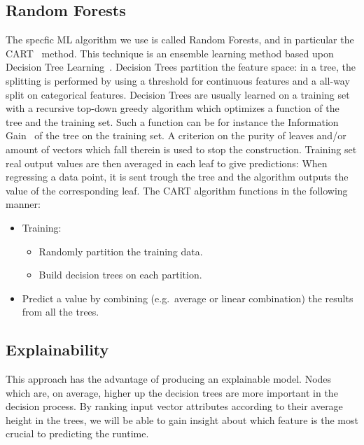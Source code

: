 \documentclass{article}
\begin{document}
\subsection{Random Forests}
\label{sub:random_forests}
The specfic ML algorithm we use is called Random Forests, and in particular the CART~\cite{randomforest} method.
This technique is an ensemble learning method based upon Decision Tree Learning~\cite{decisiontrees}.
Decision Trees partition the feature space: in a tree, the splitting is performed by using a threshold for continuous features and a all-way split on categorical features.
Decision Trees are usually learned on a training set with a recursive top-down greedy algorithm which optimizes a function of the tree and the training set.
Such a function can be for instance the Information Gain~\cite{kullback} of the tree on the training set. A criterion on the purity of leaves and/or amount of vectors which fall therein is used to stop the construction. Training set real output values are then averaged in each leaf to give predictions: When regressing a data point, it is sent trough the tree and the algorithm outputs the value of the corresponding leaf.
The CART algorithm functions in the following manner:
\begin{itemize}
  \item Training: \begin{itemize}
      \item Randomly partition the training data.
      \item Build decision trees on each partition.
    \end{itemize}
      \item Predict a value by combining (e.g.\ average or linear combination) the results from all the trees.
\end{itemize}

\subsection{Explainability}
\label{sub:explainability}
This approach has the advantage of producing an explainable model.
Nodes which are, on average, higher up the decision trees are more important in the decision process.
By ranking input vector attributes according to their average height in the trees, we will be able to gain insight about which feature is the most crucial to predicting the runtime.

\end{document}
